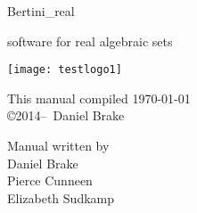\documentclass[10pt]{article}
\begin{document}
\pagestyle{plain} 

	\setcounter{page}{1}


\begin{titlepage}

	\begin{center}
	\vspace{2cm}
	{\Large Bertini\_real}

\vspace{\baselineskip}
	{\large software for real algebraic sets}
	
	\vspace{3cm}
	\texttt{[image: testlogo1]}
	\end{center}

	\vfill

	\begin{minipage}{\linewidth}

	\begin{minipage}{0.4\linewidth}
	\centering
	This manual compiled \today \\
	\copyright 2014--\the\year\ Daniel Brake
	\end{minipage}
	\hfill
	\begin{minipage}{0.4\linewidth}
	\centering Manual written by \vspace{\baselineskip}
	\\  Daniel Brake \\ Pierce Cunneen \\ Elizabeth Sudkamp 
	\end{minipage}

	\end{minipage}

	

\end{titlepage}




	\tableofcontents
	\eject
	\setcounter{page}{1}
	\eject


























\end{document}

